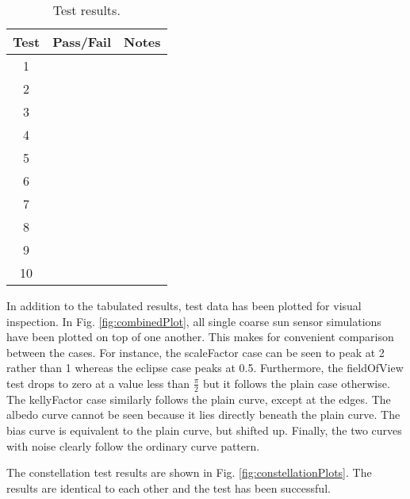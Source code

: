 \begin{table}[H]
	\caption{Test results.}
	\label{tab:results}
	\centering \fontsize{10}{10}\selectfont
	\begin{tabular}{ c | c | c } %
		\hline
		\textbf{Test} & \textbf{Pass/Fail} 						   		    & \textbf{Notes} 									      \\ \hline
		1	   			  	&      	   & 	         \\ \hline
		2	   			  	&       & 	       \\ \hline
		3	   			  	&& 	 \\ \hline
		4	   			  	& & 	   \\ \hline
		5	   			  	&& 	 \\ \hline
		6	   			  	&      	  & 	              \\ \hline
		7	   			  	&    & 	      \\ \hline
		8	   			  	&      	& 	           \\ \hline
		9	   			  	&  & 	      \\ \hline
		10	   			  	& &\\ \hline
	
	\end{tabular}
\end{table}

In addition to the tabulated results, test data has been plotted for visual inspection. In Fig. \ref{fig:combinedPlot}, all single coarse sun sensor simulations have been plotted on top of one another. This makes for convenient comparison between the cases. For instance, the scaleFactor case can be seen to peak at 2 rather than 1 whereas the eclipse case peaks at 0.5. Furthermore, the fieldOfView test drops to zero at a value less than $\frac{\pi}{2}$ but it follows the plain case otherwise. The kellyFactor case similarly follows the plain curve, except at the edges. The albedo curve cannot be seen because it lies directly beneath the plain curve. The bias curve is equivalent to the plain curve, but shifted up. Finally, the two curves with noise clearly follow the ordinary curve pattern.


\clearpage
The constellation test results are shown in Fig. \ref{fig:constellationPlots}. The results are identical to each other and the test has been successful.


